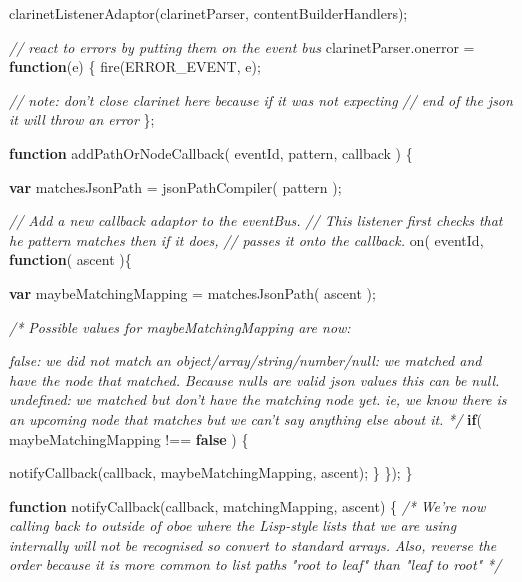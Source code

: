 \documentclass[]{article}
\newenvironment{Shaded}{}{}
\newcommand{\KeywordTok}[1]{\textcolor[rgb]{0.00,0.44,0.13}{\textbf{{#1}}}}
\newcommand{\CommentTok}[1]{\textcolor[rgb]{0.38,0.63,0.69}{\textit{{#1}}}}
\newcommand{\OtherTok}[1]{\textcolor[rgb]{0.00,0.44,0.13}{{#1}}}
\newcommand{\FunctionTok}[1]{\textcolor[rgb]{0.02,0.16,0.49}{{#1}}}
\newcommand{\NormalTok}[1]{{#1}}
\begin{document}
\begin{Shaded}
\begin{Highlighting}[]
   \FunctionTok{clarinetListenerAdaptor}\NormalTok{(clarinetParser, contentBuilderHandlers);}
  
   \CommentTok{// react to errors by putting them on the event bus}
   \OtherTok{clarinetParser}\NormalTok{.}\FunctionTok{onerror} \NormalTok{= }\KeywordTok{function}\NormalTok{(e) \{          }
      \FunctionTok{fire}\NormalTok{(ERROR_EVENT, e);}
      
      \CommentTok{// note: don't close clarinet here because if it was not expecting}
      \CommentTok{// end of the json it will throw an error}
   \NormalTok{\};}

   \KeywordTok{function} \FunctionTok{addPathOrNodeCallback}\NormalTok{( eventId, pattern, callback ) \{}
   
      \KeywordTok{var} \NormalTok{matchesJsonPath = }\FunctionTok{jsonPathCompiler}\NormalTok{( pattern );}
   
      \CommentTok{// Add a new callback adaptor to the eventBus.}
      \CommentTok{// This listener first checks that he pattern matches then if it does, }
      \CommentTok{// passes it onto the callback. }
      \FunctionTok{on}\NormalTok{( eventId, }\KeywordTok{function}\NormalTok{( ascent )\{ }
 
         \KeywordTok{var} \NormalTok{maybeMatchingMapping = }\FunctionTok{matchesJsonPath}\NormalTok{( ascent );}
     
         \CommentTok{/* Possible values for maybeMatchingMapping are now:}

\CommentTok{            false: }
\CommentTok{               we did not match }
\CommentTok{  }
\CommentTok{            an object/array/string/number/null: }
\CommentTok{               we matched and have the node that matched.}
\CommentTok{               Because nulls are valid json values this can be null.}
\CommentTok{  }
\CommentTok{            undefined: }
\CommentTok{               we matched but don't have the matching node yet.}
\CommentTok{               ie, we know there is an upcoming node that matches but we }
\CommentTok{               can't say anything else about it. }
\CommentTok{         */}
         \KeywordTok{if}\NormalTok{( maybeMatchingMapping !== }\KeywordTok{false} \NormalTok{) \{                                 }

            \FunctionTok{notifyCallback}\NormalTok{(callback, maybeMatchingMapping, ascent);                           }
         \NormalTok{\}}
      \NormalTok{\});   }
   \NormalTok{\}   }
   
   \KeywordTok{function} \FunctionTok{notifyCallback}\NormalTok{(callback, matchingMapping, ascent) \{}
      \CommentTok{/* }
\CommentTok{         We're now calling back to outside of oboe where the Lisp-style }
\CommentTok{         lists that we are using internally will not be recognised }
\CommentTok{         so convert to standard arrays. }
\CommentTok{  }
\CommentTok{         Also, reverse the order because it is more common to list paths }
\CommentTok{         "root to leaf" than "leaf to root" }
\CommentTok{      */}
            

\end{Highlighting}
\end{Shaded}
\end{document}
